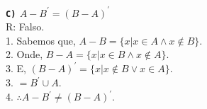 \documentclass[12pt, a4paper]{article}
\newcommand\tab[1][1cm]{\hspace*{#1}}
\begin{document}
\begin{flushleft}
\vskip10mm

\textbf{\textbf{\texttt{C)}} $A-B^{'} = (B - A)^{'} $ \\}
\textsf{R: Falso.
\\1. Sabemos que, $A - B = \{ x | x  \in A \land x \notin B \}$. 
\\2. Onde, $B - A = \{x|x \in B \land x \notin A\} $.
\\3. E, $(B - A)^{'} = \{x|x \notin B \lor x \in A\} $.
\\3. \tab \tab[0.97cm] $= B^{'} \cup A $.
\\4. \tab \tab[0.97cm] $ \therefore A-B^{'} \neq (B - A)^{'} $.}
 
 
\end{flushleft}   
\end{document}
